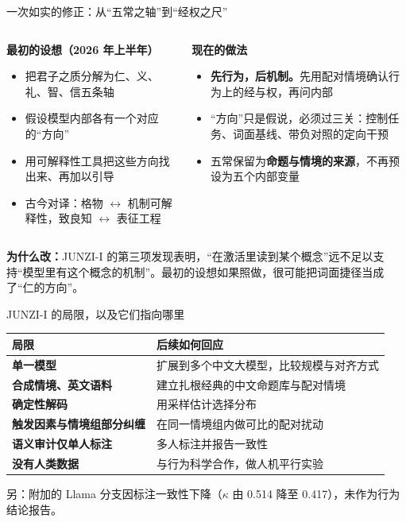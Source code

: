 \documentclass[aspectratio=169,11pt,fontset=fandol]{ctexbeamer}
\newcommand{\hg}[1]{{\bfseries\color{golddeep}#1}}       %
\begin{document}
\begin{frame}[t]{一次如实的修正：从“五常之轴”到“经权之尺”}
\begin{columns}[T,onlytextwidth]
\begin{remark}
\hg{最初的设想（2026 年上半年）}\par\vspace{3pt}
\small
\begin{itemize}\setlength{\itemsep}{2pt}
\item 把君子之质分解为仁、义、礼、智、信五条轴
\item 假设模型内部各有一个对应的“方向”
\item 用可解释性工具把这些方向找出来、再加以引导
\item 古今对译：格物 $\leftrightarrow$ 机制可解释性，致良知 $\leftrightarrow$ 表征工程
\end{itemize}
\end{remark}
\begin{thesis}
\hg{现在的做法}\par\vspace{3pt}
\small
\begin{itemize}\setlength{\itemsep}{2pt}
\item \textbf{先行为，后机制。}先用配对情境确认行为上的经与权，再问内部
\item “方向”只是假说，必须过三关：控制任务、词面基线、带负对照的定向干预
\item 五常保留为\textbf{命题与情境的来源}，不再预设为五个内部变量
\end{itemize}
\end{thesis}
\end{columns}
\vspace{5pt}
\begin{caution}
\small\textbf{为什么改：}JUNZI-I 的第三项发现表明，“在激活里读到某个概念”远不足以支持“模型里有这个概念的机制”。最初的设想如果照做，很可能把词面捷径当成了“仁的方向”。
\end{caution}
\end{frame}

\begin{frame}[t]{JUNZI-I 的局限，以及它们指向哪里}
{\small
\renewcommand{\arraystretch}{1.38}
\begin{tabularx}{\textwidth}{@{}>{\bfseries}p{3.9cm}>{\RaggedRight\arraybackslash}X@{}}
\toprule
\textcolor{golddeep}{局限} & \textcolor{golddeep}{后续如何回应}\\
\midrule
单一模型 & 扩展到多个中文大模型，比较规模与对齐方式\\
合成情境、英文语料 & 建立扎根经典的中文命题库与配对情境\\
确定性解码 & 用采样估计选择分布\\
触发因素与情境组部分纠缠 & 在同一情境组内做可比的配对扰动\\
语义审计仅单人标注 & 多人标注并报告一致性\\
没有人类数据 & 与行为科学合作，做人机平行实验\\
\bottomrule
\end{tabularx}}
\vspace{5pt}
{\small 另：附加的 Llama 分支因标注一致性下降（$\kappa$ 由 0.514 降至 0.417），未作为行为结论报告。}
\end{frame}
\end{document}

